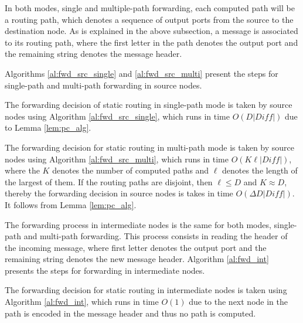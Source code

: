 In both modes, single and multiple-path forwarding, each computed path will be a routing path, which denotes a sequence of output ports from the source to the destination node. As is explained in the above subsection, a message is associated to its routing path, where the first letter in the path denotes the output port and the remaining string denotes the message header. 

Algorithms \ref{al:fwd_src_single} and \ref{al:fwd_src_multi} present the steps for single-path and multi-path forwarding in source nodes. 



\begin{lemma}
\label{lem:fdt_src_sing}
The forwarding decision of static routing in single-path mode is taken by source nodes using Algorithm
\ref{al:fwd_src_single}, which runs in time
$O(D|Diff|)$
due to Lemma \ref{lem:pc_alg}.
\end{lemma}



\begin{lemma}
\label{lem:fdt_src_mult}
The forwarding decision for static routing in multi-path mode is taken by source nodes using Algorithm \ref{al:fwd_src_multi}, which runs in time $O(K\ell|Diff| )$, where the $K$ denotes the number of computed paths and $\ell$ denotes the length of the largest of them. If the routing paths are disjoint, then $\ell\leq D$ and $K\approx D$, thereby the forwarding decision in source nodes is takes in time $O(\Delta D|Diff| )$. 
It follows from Lemma  \ref{lem:pc_alg}.
\end{lemma}

The forwarding process in intermediate nodes is the same for both modes, single-path and multi-path forwarding. This process consists in reading the header of the incoming message, where first letter denotes the output port and the remaining string denotes the new message header.
Algorithm \ref{al:fwd_int} presents the steps for forwarding in intermediate nodes. 



\begin{lemma}
\label{lem:fdt_src_int}
The forwarding decision for static routing in intermediate nodes is taken using Algorithm \ref{al:fwd_int}, which runs in time $O(1)$ due to the next node in the path is encoded in the message header and thus no path is computed.
\end{lemma}

